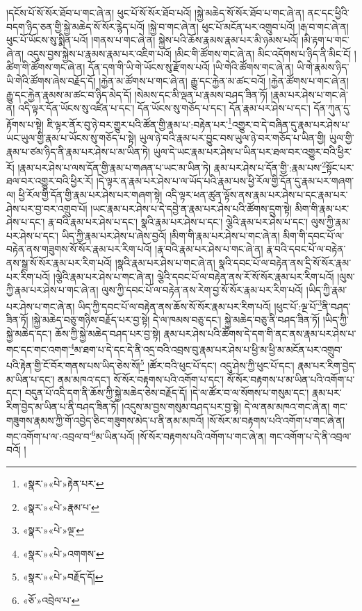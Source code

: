 །དངོས་པོ་སོ་སོར་ཐོབ་པ་གང་ཞེ་ན། ཕུང་པོ་སོ་སོར་ཐོབ་པའོ། །སྐྱེ་མཆེད་སོ་སོར་ཐོབ་པ་གང་ཞེ་ན། ནང་དང་ཕྱིའི་བདག་ཉིད་ཅན་གྱི་སྐྱེ་མཆེད་སོ་སོར་རྙེད་པའོ། །སྐྱེ་བ་གང་ཞེ་ན། ཕུང་པོ་མངོན་པར་འགྲུབ་པའོ། །རྒ་བ་གང་ཞེ་ན། ཕུང་པོ་ཡོངས་སུ་སྨིན་པའོ། །གནས་པ་གང་ཞེ་ན། སྐྱེས་པའི་ཆོས་རྣམས་རྣམ་པར་མི་ཉམས་པའོ། །མི་རྟག་པ་གང་ཞེ་ན། འདུས་བྱས་སྐྱེས་པ་རྣམས་རྣམ་པར་འཇིག་པའོ། །མིང་གི་ཚོགས་གང་ཞེ་ན། མིང་འདོགས་པ་ཉིད་ནི་མིང་ངོ། །ཚིག་གི་ཚོགས་གང་ཞེ་ན། དོན་དག་གི་ཡི་གེ་ཡོངས་སུ་རྫོགས་པའོ། །ཡི་གེའི་ཚོགས་གང་ཞེ་ན། ཡི་གེ་རྣམས་ཉིད་ཡི་གེའི་ཚོགས་ཞེས་བརྗོད་དོ། །རྐྱེན་མ་ཚོགས་པ་གང་ཞེ་ན། རྒྱུ་དང་རྐྱེན་མ་ཚང་བའོ། །རྐྱེན་ཚོགས་པ་གང་ཞེ་ན། རྒྱུ་དང་རྐྱེན་རྣམས་མ་ཚང་བ་ཉིད་མེད་དོ། །སེམས་དང་མི་ལྡན་པ་རྣམས་བཤད་ཟིན་ཏོ། །རྣམ་པར་ཤེས་པ་གང་ཞེ་ན། འདི་ལྟར་དོན་ཡོངས་སུ་འཛིན་པ་དང་། དོན་ཡོངས་སུ་གཅོད་པ་དང་། དོན་རྣམ་པར་ཤེས་པ་དང་། དོན་ཀུན་དུ་རྟོགས་པ་སྟེ། ཇི་ལྟར་ནོར་བུ་ཉེ་བར་གྱུར་པའི་ཚོན་གྱི་རྣམ་པ་:བརྟེན་པར་\footnote{«སྣར་»«པེ་»རྟེན་པར་}འགྱུར་བ་དེ་བཞིན་དུ་རྣམ་པར་ཤེས་པ་ཡང་ཡུལ་གྱི་རྣམ་པ་ཡོངས་སུ་གཅོད་པ་སྟེ། ཡུལ་ཉེ་བའི་རྣམ་པར་བྱུང་བས་ཡུལ་ཉེ་བར་གཅོད་པ་ཡིན་གྱི། ཡུལ་གྱི་རྣམ་པ་ཙམ་ཉིད་ནི་རྣམ་པར་ཤེས་པ་མ་ཡིན་ཏེ། ཡུལ་དེ་ཡང་རྣམ་པར་ཤེས་པ་ཡིན་པར་ཐལ་བར་འགྱུར་བའི་ཕྱིར་རོ། །རྣམ་པར་ཤེས་པ་ལས་དོན་གྱི་རྣམ་པ་གཞན་པ་ཡང་མ་ཡིན་ཏེ། རྣམ་པར་ཤེས་པ་དོན་གྱི་:རྣམ་པས་\footnote{«སྣར་»«པེ་»རྣམ་པ་}སྟོང་པར་ཐལ་བར་འགྱུར་བའི་ཕྱིར་རོ། །དེ་ལྟར་ན་རྣམ་པར་ཤེས་པ་ལ་ཡོད་པའི་རྣམ་པས་ཕྱི་རོལ་གྱི་དོན་དུ་རྣམ་པར་གཞག་ལ། ཕྱི་རོལ་གྱི་དོན་གྱི་རྣམ་པར་ཤེས་པར་གཞག་སྟེ། འདི་ལྟར་ཕན་ཚུན་ལྟོས་ནས་རྣམ་པར་ཤེས་པ་དང་རྣམ་པར་ཤེས་པར་བྱ་བར་འགྲུབ་པོ། །ཡང་རྣམ་པར་ཤེས་པ་དེ་དབྱེ་ན་རྣམ་པར་ཤེས་པའི་ཚོགས་དྲུག་སྟེ། མིག་གི་རྣམ་པར་ཤེས་པ་དང་། རྣ་བའི་རྣམ་པར་ཤེས་པ་དང་། སྣའི་རྣམ་པར་ཤེས་པ་དང་། ལྕེའི་རྣམ་པར་ཤེས་པ་དང་། ལུས་ཀྱི་རྣམ་པར་ཤེས་པ་དང་། ཡིད་ཀྱི་རྣམ་པར་ཤེས་པ་ཞེས་བྱའོ། །མིག་གི་རྣམ་པར་ཤེས་པ་གང་ཞེ་ན། མིག་གི་དབང་པོ་ལ་བརྟེན་ནས་གཟུགས་སོ་སོར་རྣམ་པར་རིག་པའོ། །རྣ་བའི་རྣམ་པར་ཤེས་པ་གང་ཞེ་ན། རྣ་བའི་དབང་པོ་ལ་བརྟེན་ནས་སྒྲ་སོ་སོར་རྣམ་པར་རིག་པའོ། །སྣའི་རྣམ་པར་ཤེས་པ་གང་ཞེ་ན། སྣའི་དབང་པོ་ལ་བརྟེན་ནས་དྲི་སོ་སོར་རྣམ་པར་རིག་པའོ། །ལྕེའི་རྣམ་པར་ཤེས་པ་གང་ཞེ་ན། ལྕེའི་དབང་པོ་ལ་བརྟེན་ནས་རོ་སོ་སོར་རྣམ་པར་རིག་པའོ། །ལུས་ཀྱི་རྣམ་པར་ཤེས་པ་གང་ཞེ་ན། ལུས་ཀྱི་དབང་པོ་ལ་བརྟེན་ནས་རེག་བྱ་སོ་སོར་རྣམ་པར་རིག་པའོ། །ཡིད་ཀྱི་རྣམ་པར་ཤེས་པ་གང་ཞེ་ན། ཡིད་ཀྱི་དབང་པོ་ལ་བརྟེན་ནས་ཆོས་སོ་སོར་རྣམ་པར་རིག་པའོ། །ཕུང་པོ་:ལྔ་པོ་\footnote{«སྣར་»«པེ་»ལྔ་}ནི་བཤད་ཟིན་ཏོ། །སྐྱེ་མཆེད་བཅུ་གཉིས་བརྗོད་པར་བྱ་སྟེ། དེ་ལ་ཁམས་བཅུ་དང་། སྐྱེ་མཆེད་བཅུ་ནི་བཤད་ཟིན་ཏོ། །ཡིད་ཀྱི་སྐྱེ་མཆེད་དང་། ཆོས་ཀྱི་སྐྱེ་མཆེད་བཤད་པར་བྱ་སྟེ། རྣམ་པར་ཤེས་པའི་ཚོགས་དེ་དག་གི་ནང་ནས་རྣམ་པར་ཤེས་པ་གང་དང་གང་འགག་\footnote{«སྣར་»«པེ་»འགགས་}མ་ཐག་པ་དེ་དང་དེ་ནི་འདྲ་བའི་འབྲས་བུ་རྣམ་པར་ཤེས་པ་ཕྱི་མ་ཕྱི་མ་མངོན་པར་འགྲུབ་པའི་རྟེན་གྱི་ངོ་བོར་གནས་པས་ཡིད་ཅེས་སོ།\footnote{«སྣར་»«པེ་»བརྗོད་དོ།} །ཚོར་བའི་ཕུང་པོ་དང་། འདུ་ཤེས་ཀྱི་ཕུང་པོ་དང་། རྣམ་པར་རིག་བྱེད་མ་ཡིན་པ་དང་། ནམ་མཁའ་དང་། སོ་སོར་བརྟགས་པའི་འགོག་པ་དང་། སོ་སོར་བརྟགས་པ་མ་ཡིན་པའི་འགོག་པ་དང་། བདུན་པོ་འདི་དག་ནི་ཆོས་ཀྱི་སྐྱེ་མཆེད་ཅེས་བརྗོད་དོ། །དེ་ལ་ཚོར་བ་ལ་སོགས་པ་གསུམ་དང་། རྣམ་པར་རིག་བྱེད་མ་ཡིན་པ་ནི་བཤད་ཟིན་ཏོ། །འདུས་མ་བྱས་གསུམ་བཤད་པར་བྱ་སྟེ། དེ་ལ་ནམ་མཁའ་གང་ཞེ་ན། གང་གཟུགས་རྣམས་ཀྱི་གོ་འབྱེད་ཅིང་གཟུགས་མེད་པ་ནི་ནམ་མཁའོ། །སོ་སོར་མ་བརྟགས་པའི་འགོག་པ་གང་ཞེ་ན། གང་འགོག་པ་ལ་:འབྲལ་བ་\footnote{«ཅོ་»འབྲེལ་པ་}མ་ཡིན་པའོ། །སོ་སོར་བརྟགས་པའི་འགོག་པ་གང་ཞེ་ན། གང་འགོག་པ་དེ་ནི་འབྲལ་བའོ། །
